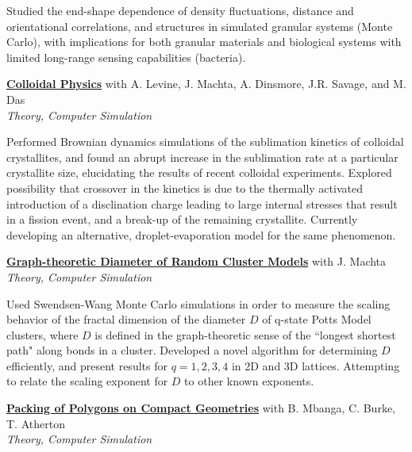 \documentclass[10pt]{article}
\newcommand{\blankline}{\quad\pagebreak[3]}
\newcommand{\halfblankline}{\quad\vspace{-0.5\baselineskip}\pagebreak[3]}
\begin{document}
\halfblankline

Studied the end-shape dependence of density fluctuations, distance and orientational correlations, and structures in simulated granular systems (Monte Carlo), with implications for both granular materials and biological systems with limited long-range sensing capabilities (bacteria). 

\blankline

\href{http://dwblair.github.io}{\textbf{Colloidal Physics}} \hfill {with A. Levine, J. Machta, A. Dinsmore, J.R. Savage, and M. Das} \\
\emph{Theory, Computer Simulation} 

\halfblankline

Performed Brownian dynamics simulations of the sublimation kinetics of colloidal crystallites, and found an abrupt increase in the sublimation rate at a particular crystallite size, elucidating the results of
recent colloidal experiments. Explored possibility that crossover in the kinetics is due to the thermally activated
introduction of a disclination charge leading to large internal stresses that result in a fission event, and a
break-up of the remaining crystallite. Currently developing an alternative, droplet-evaporation
model for the same phenomenon.

\blankline

\href{http://dwblair.github.io}{\textbf{Graph-theoretic Diameter of Random Cluster Models}} \hfill {with J. Machta} \\
\emph{Theory, Computer Simulation} 

\halfblankline

Used Swendsen-Wang Monte Carlo simulations in order to measure the scaling behavior of the fractal
dimension of the diameter $D$ of q-state Potts Model clusters, where $D$ is defined in the graph-theoretic
sense of the ``longest shortest path" along bonds in a cluster. Developed a novel algorithm for
determining $D$ efficiently, and present results for $q = 1, 2, 3, 4$ in 2D and 3D lattices. Attempting to
relate the scaling exponent for $D$ to other known exponents.

\blankline

\href{http://dwblair.github.io}{\textbf{Packing of Polygons on Compact Geometries}} \hfill {with B. Mbanga, C. Burke, T. Atherton} \\
\emph{Theory, Computer Simulation} 

\halfblankline
\end{document}
